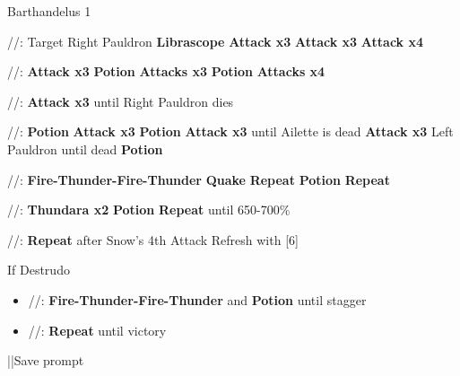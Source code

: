 \begin{fight}{Barthandelus 1}
	\item [1] \com/\syn/\com: Target Right Pauldron \to \textbf{Librascope} \to \textbf{Attack x3} \to \textbf{Attack x3} \to \textbf{Attack x4}
	\item [6] \com/\com/\com: \textbf{Attack x3} \to \textbf{Potion} \to \textbf{Attacks x3} \to \textbf{Potion} \to \textbf{Attacks x4}
	\item [5] \com/\com/\com: \textbf{Attack x3} until Right Pauldron dies
	\item [1] \com/\syn/\com: \textbf{Potion} \to \textbf{Attack x3} \to \textbf{Potion} \to \textbf{Attack x3} until Ailette is dead \to \textbf{Attack x3} Left Pauldron until dead \to \textbf{Potion}
	\item [2] \rav/\rav/\rav: \textbf{Fire-Thunder-Fire-Thunder} \to \textbf{Quake} \to \textbf{Repeat} \to \textbf{Potion} \to \textbf{Repeat}
	\item [4] \rav/\rav/\rav: \textbf{Thundara x2} \to \textbf{Potion} \to \textbf{Repeat} until 650-700\%
	\item [5] \com/\com/\com: \textbf{Repeat} after Snow's 4th Attack \to Refresh with [6]
	\item If Destrudo
	\begin{itemize}
		\item [4] \rav/\rav/\rav: \textbf{Fire-Thunder-Fire-Thunder} and \textbf{Potion} until stagger
		\item [5] \com/\com/\com: \textbf{Repeat} until victory
	\end{itemize}
	\item ||Save prompt
\end{fight}
